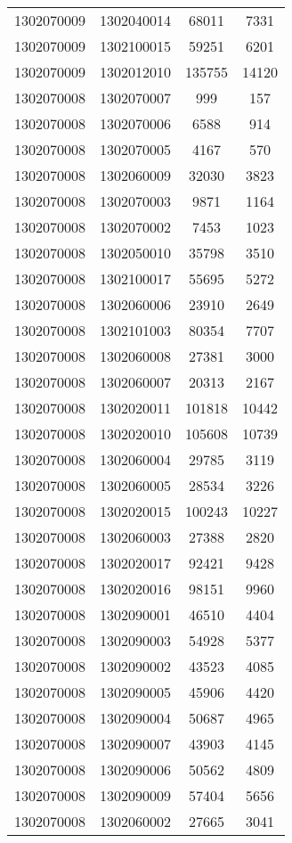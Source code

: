 \begin{longtable}[h]{llcc}
		1302070009 & 1302040014 & 68011 & 7331\\
		1302070009 & 1302100015 & 59251 & 6201\\
		1302070009 & 1302012010 & 135755 & 14120\\
		1302070008 & 1302070007 & 999 & 157\\
		1302070008 & 1302070006 & 6588 & 914\\
		1302070008 & 1302070005 & 4167 & 570\\
		1302070008 & 1302060009 & 32030 & 3823\\
		1302070008 & 1302070003 & 9871 & 1164\\
		1302070008 & 1302070002 & 7453 & 1023\\
		1302070008 & 1302050010 & 35798 & 3510\\
		1302070008 & 1302100017 & 55695 & 5272\\
		1302070008 & 1302060006 & 23910 & 2649\\
		1302070008 & 1302101003 & 80354 & 7707\\
		1302070008 & 1302060008 & 27381 & 3000\\
		1302070008 & 1302060007 & 20313 & 2167\\
		1302070008 & 1302020011 & 101818 & 10442\\
		1302070008 & 1302020010 & 105608 & 10739\\
		1302070008 & 1302060004 & 29785 & 3119\\
		1302070008 & 1302060005 & 28534 & 3226\\
		1302070008 & 1302020015 & 100243 & 10227\\
		1302070008 & 1302060003 & 27388 & 2820\\
		1302070008 & 1302020017 & 92421 & 9428\\
		1302070008 & 1302020016 & 98151 & 9960\\
		1302070008 & 1302090001 & 46510 & 4404\\
		1302070008 & 1302090003 & 54928 & 5377\\
		1302070008 & 1302090002 & 43523 & 4085\\
		1302070008 & 1302090005 & 45906 & 4420\\
		1302070008 & 1302090004 & 50687 & 4965\\
		1302070008 & 1302090007 & 43903 & 4145\\
		1302070008 & 1302090006 & 50562 & 4809\\
		1302070008 & 1302090009 & 57404 & 5656\\
		1302070008 & 1302060002 & 27665 & 3041\\

\end{longtable}
